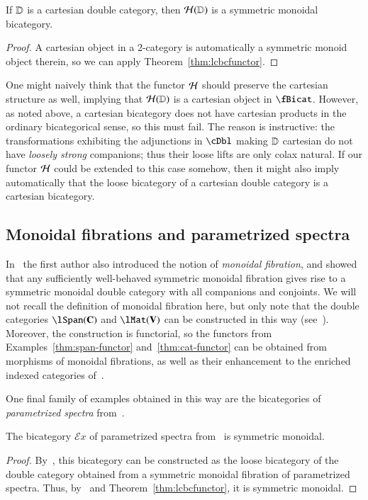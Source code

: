 \begin{thm}
  If $\mathbb{D}$ is a cartesian double category, then $\mathcal{H}(\mathbb{D})$ is a symmetric monoidal bicategory.
\end{thm}
\begin{proof}
  A cartesian object in a 2-category is automatically a symmetric monoid object therein, so we can apply Theorem~\ref{thm:lcbcfunctor}.
\end{proof}

One might naively think that the functor $\mathcal{H}$ should preserve the cartesian structure as well, implying that $\mathcal{H}(\mathbb{D})$ is a cartesian object in $\fBicat$.
However, as noted above, a cartesian bicategory does not have cartesian products in the ordinary bicategorical sense, so this must fail.
The reason is instructive: the transformations exhibiting the adjunctions in $\cDbl$ making $\mathbb{D}$ cartesian do not have \emph{loosely strong} companions; thus their loose lifts are only colax natural.
If our functor $\mathcal{H}$ could be extended to this case somehow, then it might also imply automatically that the loose bicategory of a cartesian double category is a cartesian bicategory.


\subsection{Monoidal fibrations and parametrized spectra}
\label{sec:mfps}

In~\cite{shulman:frbi} the first author also introduced the notion of \emph{monoidal fibration}, and showed that any sufficiently well-behaved symmetric monoidal fibration gives rise to a symmetric monoidal double category with all companions and conjoints.
We will not recall the definition of monoidal fibration here, but only note that the double categories $\lSpan(\cat{C})$ and $\lMat(\cat{V})$ can be constructed in this way (see~\cite[Examples 15.3 and 15.4]{shulman:frbi}).
Moreover, the construction is functorial, so the functors from Examples~\ref{thm:span-functor} and~\ref{thm:cat-functor} can be obtained from morphisms of monoidal fibrations, as well as their enhancement to the enriched indexed categories of~\cite{shulman:eicats}.

One final family of examples obtained in this way are the bicategories of \emph{parametrized spectra} from~\cite{maysig:pht}.

\begin{thm}
  The bicategory $\mathcal{E}\mathit{x}$ of parametrized spectra from~\cite[Chapter 17]{maysig:pht} is symmetric monoidal.
\end{thm}
\begin{proof}
  By~\cite[Example 14.6]{shulman:frbi}, this bicategory can be constructed as the loose bicategory of the double category obtained from a symmetric monoidal fibration of parametrized spectra.
  Thus, by~\cite[Theorem 14.2]{shulman:frbi} and Theorem~\ref{thm:lcbcfunctor}, it is symmetric monoidal.
\end{proof}

